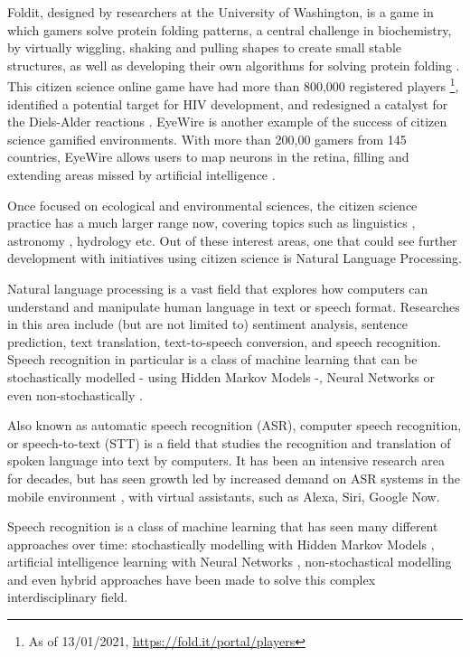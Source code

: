 Foldit, designed by researchers at the University of Washington, is a game in which gamers solve protein folding patterns, a central challenge in biochemistry, by virtually wiggling, shaking and pulling shapes to create small stable structures, as well as developing their own algorithms for solving protein folding \cite{bourzac2008enlisting}. This citizen science online game have had more than 800,000 registered players \footnote{As of 13/01/2021, \url{https://fold.it/portal/players}}, identified a potential target for HIV development, and redesigned a catalyst for the Diels-Alder reactions \cite{kreitmair2019citizen}. EyeWire is another example of the success of citizen science gamified environments. With more than 200,00 gamers from 145 countries, EyeWire allows users to map neurons in the retina, filling and extending areas missed by artificial intelligence \cite{kreitmair2019citizen}.

Once focused on ecological and environmental sciences, the citizen science practice has a much larger range now, covering topics such as linguistics \cite{svendsen2018dynamics}, astronomy \cite{marshall2015ideas}, hydrology \cite{buytaert2014citizen} etc. Out of these interest areas, one that could see further development with initiatives using citizen science is Natural Language Processing.

Natural language processing is a vast field that explores how computers can understand and manipulate human language in text or speech format. Researches in this area include (but are not limited to) sentiment analysis, sentence prediction, text translation, text-to-speech conversion, and speech recognition. Speech recognition in particular is a class of machine learning that can be stochastically modelled - using Hidden Markov Models \cite{gales2008application} -, Neural Networks \cite{graves2013speech} or even non-stochastically \cite{burget2003nonrandomattr}.

Also known as automatic speech recognition (ASR), computer speech recognition, or speech-to-text (STT) is a field that studies the recognition and translation of spoken language into text by computers. It has been an intensive research area for decades, but has seen growth led by increased demand on ASR systems in the mobile environment \cite{yu2016automatic}, with virtual assistants, such as Alexa, Siri, Google Now.

Speech recognition is a class of machine learning that has seen many different approaches over time: stochastically modelling with Hidden Markov Models  \cite{gales2008application}, artificial intelligence learning with Neural Networks \cite{graves2013speech}, non-stochastical modelling \cite{burget2003nonrandomattr} and even hybrid approaches \cite{wang2020transformer} have been made to solve this complex interdisciplinary field.

